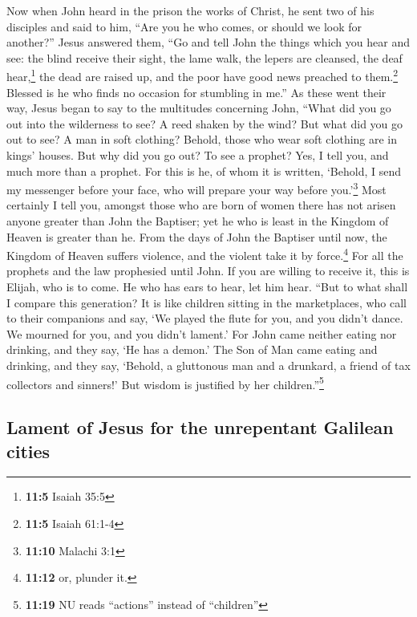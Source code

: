  Now when John heard in the prison the works of Christ, he
sent two of his disciples  and said to him, ``Are you he
who comes, or should we look for another?''  Jesus
answered them, ``Go and tell John the things which you hear and see:
 the blind receive their sight, the lame walk, the lepers
are cleansed, the deaf hear,\footnote{\textbf{11:5} Isaiah 35:5} the
dead are raised up, and the poor have good news preached to
them.\footnote{\textbf{11:5} Isaiah 61:1-4}  Blessed is he
who finds no occasion for stumbling in me.''  As these
went their way, Jesus began to say to the multitudes concerning John,
``What did you go out into the wilderness to see? A reed shaken by the
wind?  But what did you go out to see? A man in soft
clothing? Behold, those who wear soft clothing are in kings' houses.
 But why did you go out? To see a prophet? Yes, I tell
you, and much more than a prophet.  For this is he, of
whom it is written, `Behold, I send my messenger before your face, who
will prepare your way before you.'\footnote{\textbf{11:10} Malachi 3:1}
 Most certainly I tell you, amongst those who are born of
women there has not arisen anyone greater than John the Baptiser; yet he
who is least in the Kingdom of Heaven is greater than he.
 From the days of John the Baptiser until now, the
Kingdom of Heaven suffers violence, and the violent take it by
force.\footnote{\textbf{11:12} or, plunder it.}  For all
the prophets and the law prophesied until John.  If you
are willing to receive it, this is Elijah, who is to come.
 He who has ears to hear, let him hear. 
``But to what shall I compare this generation? It is like children
sitting in the marketplaces, who call to their companions
 and say, `We played the flute for you, and you didn't
dance. We mourned for you, and you didn't lament.'  For
John came neither eating nor drinking, and they say, `He has a demon.'
 The Son of Man came eating and drinking, and they say,
`Behold, a gluttonous man and a drunkard, a friend of tax collectors and
sinners!' But wisdom is justified by her children.''\footnote{\textbf{11:19}
  NU reads ``actions'' instead of ``children''}

\hypertarget{lament-of-jesus-for-the-unrepentant-galilean-cities}{%
\subsection{Lament of Jesus for the unrepentant Galilean
cities}\label{lament-of-jesus-for-the-unrepentant-galilean-cities}}


